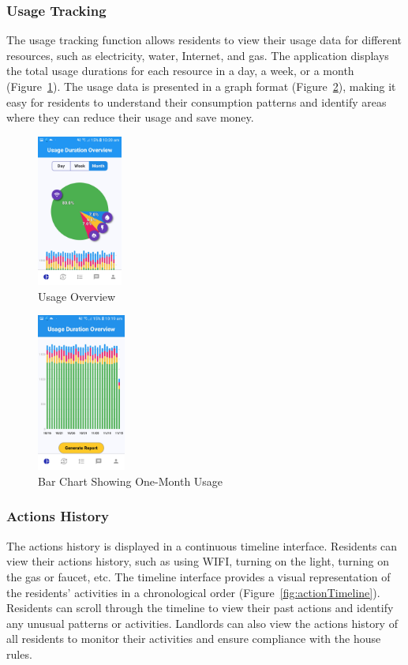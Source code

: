 \documentclass[sigconf]{acmart}
\begin{document}
\subsubsection{Usage Tracking}
The usage tracking function allows residents to view their usage data for different resources, such as electricity, water, Internet, and gas. The application displays the total usage durations for each resource in a day, a week, or a month (Figure~\ref{fig:usageOverview}). The usage data is presented in a graph format (Figure~\ref{fig:barChart}), making it easy for residents to understand their consumption patterns and identify areas where they can reduce their usage and save money.

\begin{figure}[h]
  \centering
  \includegraphics[width=0.25\textwidth]{pieChartOverview.jpg}
  \caption{Usage Overview}
  \label{fig:usageOverview}
\end{figure}
\begin{figure}[h]
  \centering
  \includegraphics[width=0.26\textwidth]{30DayBarChart.jpg}
  \caption{Bar Chart Showing One-Month Usage}
  \label{fig:barChart}
\end{figure}

\subsubsection{Actions History}
The actions history is displayed in a continuous timeline interface. Residents can view their actions history, such as using WIFI, turning on the light, turning on the gas or faucet, etc. The timeline interface provides a visual representation of the residents' activities in a chronological order (Figure~\ref{fig:actionTimeline}). Residents can scroll through the timeline to view their past actions and identify any unusual patterns or activities. Landlords can also view the actions history of all residents to monitor their activities and ensure compliance with the house rules.
\end{document}
